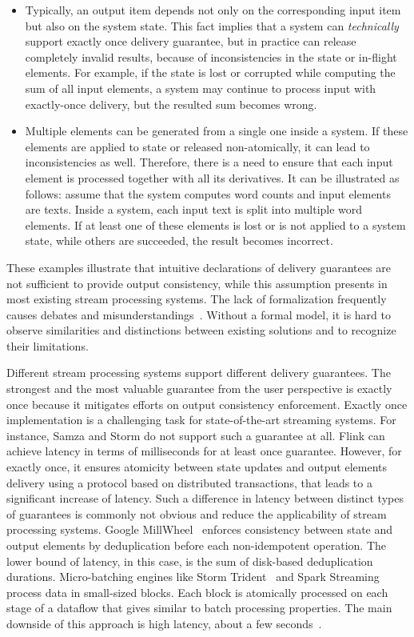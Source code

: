 \begin{itemize}
    \item Typically, an output item depends not only on the corresponding input item but also on the system state. This fact implies that a system can {\em technically} support exactly once delivery guarantee, but in practice can release completely invalid results, because of inconsistencies in the state or in-flight elements. For example, if the state is lost or corrupted while computing the sum of all input elements, a system may continue to process input with exactly-once delivery, but the resulted sum becomes wrong. 
    \item Multiple elements can be generated from a single one inside a system. If these elements are applied to state or released non-atomically, it can lead to inconsistencies as well. Therefore, there is a need to ensure that each input element is processed together with all its derivatives. It can be illustrated as follows: assume that the system computes word counts and input elements are texts. Inside a system, each input text is split into multiple word elements. If at least one of these elements is lost or is not applied to a system state, while others are succeeded, the result becomes incorrect. 
\end{itemize}

These examples illustrate that intuitive declarations of delivery guarantees are not sufficient to provide output consistency, while this assumption presents in most existing stream processing systems. The lack of formalization frequently causes debates and misunderstandings~\cite{JerryPengStreamIO, PaperTrail}. Without a formal model, it is hard to observe similarities and distinctions between existing solutions and to recognize their limitations.

Different stream processing systems support different delivery guarantees. The strongest and the most valuable guarantee from the user perspective is exactly once because it mitigates efforts on output consistency enforcement. Exactly once implementation is a challenging task for state-of-the-art streaming systems. For instance, Samza and Storm do not support such a guarantee at all. Flink can achieve latency in terms of milliseconds for at least once guarantee. However, for exactly once, it ensures atomicity between state updates and output elements delivery using a protocol based on distributed transactions, that leads to a significant increase of latency. Such a difference in latency between distinct types of guarantees is commonly not obvious and reduce the applicability of stream processing systems. Google MillWheel~\cite{Akidau:2013:MFS:2536222.2536229} enforces consistency between state and output elements by deduplication before each non-idempotent operation. The lower bound of latency, in this case, is the sum of disk-based deduplication durations. Micro-batching engines like Storm Trident~\cite{apache:storm:trident} and Spark Streaming~\cite{Zaharia:2012:DSE:2342763.2342773} process data in small-sized blocks. Each block is atomically processed on each stage of a dataflow that gives similar to batch processing properties. The main downside of this approach is high latency, about a few seconds~\cite{7530084, 7474816}.

